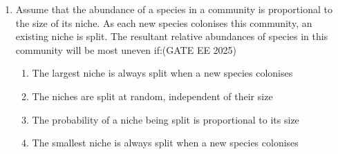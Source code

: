 \begin{enumerate}[leftmargin=*,label=\textbf{Q.\arabic*},resume]
\begin{multicols}{2}
\begin{enumerate}
\item Crocodiles are more closely related to birds than to the other reptiles
\item Fish, lizards and snakes have a common ancestor
\item Mammals and reptiles have evolved from amphibians
\item Mammals are more closely related to crocodiles than to amphibians
\end{enumerate}
\end{multicols}

\item Assume that the abundance of a species in a community is proportional to the size of its niche. As each new species colonises this community, an existing niche is split. The resultant relative abundances of species in this community will be most uneven if:\hfill {(GATE EE 2025)}
\begin{multicols}{2}
\begin{enumerate}
\item The largest niche is always split when a new species colonises
\item The niches are split at random, independent of their size
\item The probability of a niche being split is proportional to its size
\item The smallest niche is always split when a new species colonises
\end{enumerate}
\end{multicols}

\end{enumerate}
\newpage
{}

